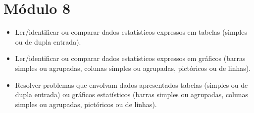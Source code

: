 \chapter{Módulo 8}



\begin{itemize}
\item Ler/identificar ou comparar dados estatísticos expressos em tabelas
(simples ou de dupla entrada).

\item Ler/identificar ou comparar dados estatísticos expressos em gráficos
(barras simples ou agrupadas, colunas simples ou agrupadas, pictóricos
ou de linhas).

\item Resolver problemas que envolvam dados apresentados tabelas (simples ou
de dupla entrada) ou gráficos estatísticos (barras simples ou agrupadas,
colunas simples ou agrupadas, pictóricos ou de linhas).
\end{itemize}


